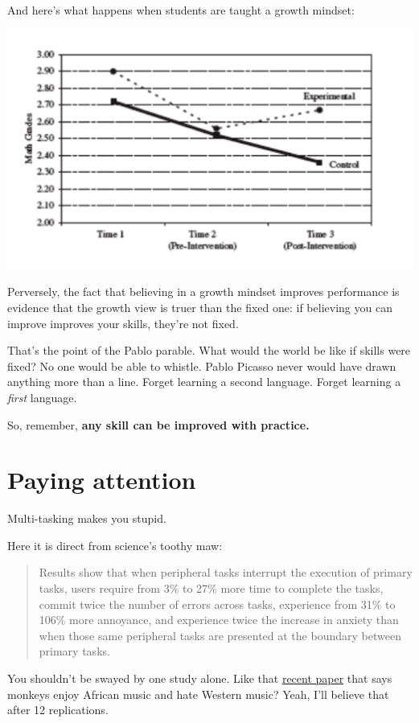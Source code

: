 And here's what happens when students are taught a growth mindset:

\includegraphics[width=\textwidth]{graphics/math-intervention-dweck}

Perversely, the fact that believing in a growth mindset
improves performance is evidence that the growth view is truer than the fixed
one: if believing you can improve improves your skills, they're not fixed.

That's the point of the Pablo parable. What would the world be like
if skills were fixed? No one would be able to whistle. Pablo Picasso
never would have drawn anything more than a line. Forget learning a second
language. Forget learning a \textit{first} language.

So, remember, \textbf{any skill can be improved with practice.}

\section{Paying attention}

Multi-tasking makes you stupid.

Here it is direct from science's toothy maw:

\begin{quote}
Results show that when peripheral tasks interrupt the execution of primary
tasks, users require from 3\% to 27\% more time to complete the tasks, commit
twice the number of errors across tasks, experience from 31\% to 106\% more
annoyance, and experience twice the increase in anxiety than when those same
peripheral tasks are presented at the boundary between primary tasks.\cite{bailey2006need}
\end{quote}

You shouldn't be swayed by one study alone. Like that \href{http://www.apa.org/news/press/releases/2014/06/chimps-music.aspx}{recent paper} that
says monkeys enjoy African music and hate Western music? Yeah, I'll believe
that after 12 replications. 

